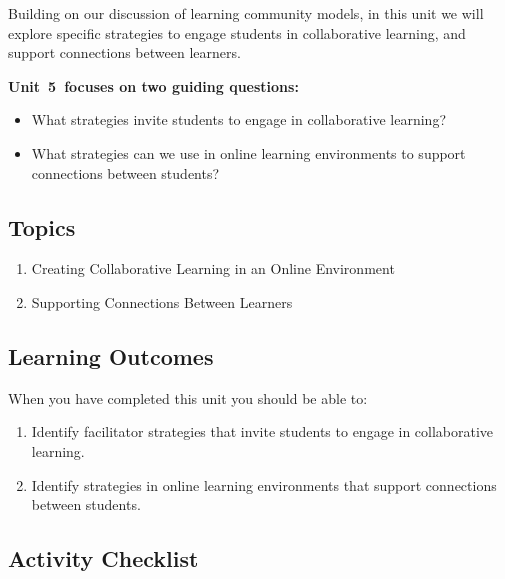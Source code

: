 \documentclass[
]{book}
\providecommand{\tightlist}{%
  \setlength{\itemsep}{0pt}\setlength{\parskip}{0pt}}
\begin{document}
Building on our discussion of learning community models, in this unit we will explore specific strategies to engage students in collaborative learning, and support connections between learners.

\textbf{Unit~5~focuses on two guiding questions:}

\begin{itemize}
\tightlist
\item
  What strategies invite students to engage in collaborative learning?\\
\item
  What strategies can we use in online learning environments to support connections between students?
\end{itemize}

\hypertarget{topics-4}{%
\subsection*{Topics}\label{topics-4}}

\begin{enumerate}
\def\labelenumi{\arabic{enumi}.}
\tightlist
\item
  Creating Collaborative Learning in an Online Environment\\
\item
  Supporting Connections Between Learners
\end{enumerate}

\hypertarget{learning-outcomes-4}{%
\subsection*{Learning Outcomes}\label{learning-outcomes-4}}

When you have completed this unit you should be able to:

\begin{enumerate}
\def\labelenumi{\arabic{enumi}.}
\tightlist
\item
  Identify facilitator strategies that invite students to engage in collaborative learning.\\
\item
  Identify strategies in online learning environments that support connections between students.
\end{enumerate}

\hypertarget{activity-checklist-4}{%
\subsection*{Activity Checklist}\label{activity-checklist-4}}
\end{document}
